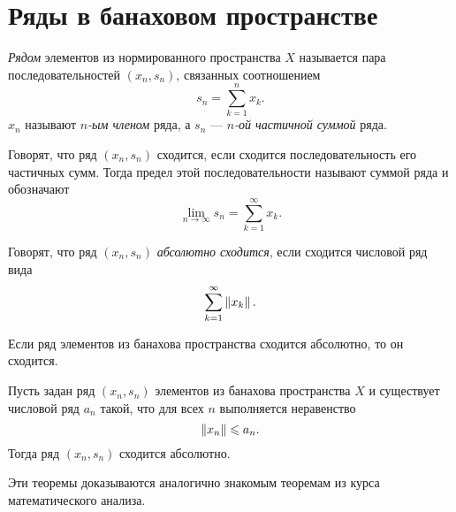 \section{Ряды в банаховом пространстве}
\begin{definition}
    \emph{Рядом} элементов из нормированного пространства $X$ называется пара
    последовательностей $(x_n, s_n)$, связанных соотношением
    \[ s_n = \sum_{k=1}^n x_k. \]
    $x_n$ называют \emph{$n$-ым членом} ряда, а $s_n$ --- \emph{$n$-ой частичной
    суммой} ряда.
\end{definition}

\begin{definition}
    Говорят, что ряд $(x_n, s_n)$ сходится, если сходится последовательность его
    частичных сумм. Тогда предел этой последовательности называют суммой ряда и
    обозначают
    \[ \lim_{n\to\infty} s_n = \sum_{k=1}^\infty x_k. \]
\end{definition}

\begin{definition}
    Говорят, что ряд $(x_n, s_n)$ \emph{абсолютно сходится}, если сходится числовой ряд
    вида
    \[ \sum_{k=1}^\infty \left\|x_k\right\|. \]
\end{definition}

\begin{theorem}
    Если ряд элементов из банахова пространства 
    сходится абсолютно, то он сходится.
\end{theorem}

\begin{theorem}
    Пусть задан ряд $(x_n, s_n)$ элементов из банахова пространства $X$ и
    существует числовой ряд $a_n$ такой, что для всех $n$ выполняется
    неравенство
    \[ \left\|x_n\right\| \leqslant a_n. \]
    Тогда ряд $(x_n, s_n)$ сходится абсолютно.
\end{theorem}

Эти теоремы доказываются аналогично знакомым теоремам из курса математического
анализа.
